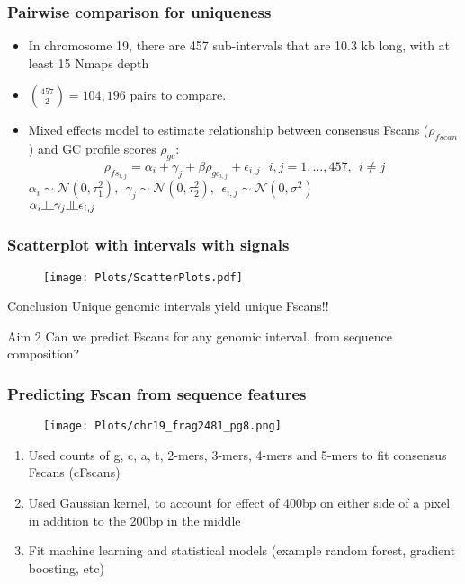 \documentclass[10pt,dvipsnames,table]{beamer}
\begin{document}
\begin{frame}
\frametitle{Pairwise comparison for uniqueness}
\begin{itemize}
\item In chromosome 19, there are 457 sub-intervals that are 10.3 kb long, with at least 15 Nmaps depth
\item $ \binom {457} {2} = 104,196 $ pairs to compare. 
\item Mixed effects model to estimate relationship between consensus Fscans ($\rho_{fscan}$) and GC profile scores $\rho_{gc}$:
\[ 
\rho_{fs_{i,j}} = \alpha_i + \gamma_j + \beta \rho_{gc_{i,j}} + \epsilon_{i,j}\ \ \ i, j = 1, \dots, 457,\ \ i \ne j
\]
$\alpha_i \sim \mathcal{N}(0, \tau_1^2), \ \ \gamma_j \sim \mathcal{N}(0, \tau_2^2), \ \ \epsilon_{i,j} \sim \mathcal{N}(0, \sigma^2)$ \\
$ \alpha_i \indep \gamma_j \indep \epsilon_{i,j}$
\end{itemize}

\end{frame}

\begin{frame}
\frametitle{Scatterplot with intervals with signals}
\begin{figure}
\centering
\texttt{[image: Plots/ScatterPlots.pdf]}
\end{figure}

\begin{block}{Conclusion}
Unique genomic intervals yield unique Fscans!!
\end{block}

\end{frame}

\begin{frame}
\Large
\begin{block}{Aim 2}
Can we predict Fscans for any genomic interval, from sequence composition?
\end{block}
\end{frame}

\begin{frame}
\frametitle{Predicting Fscan from sequence features}
\begin{figure}
\centering
\texttt{[image: Plots/chr19\_frag2481\_pg8.png]}
\end{figure}
\begin{enumerate}
\item Used counts of g, c, a, t, 2-mers, 3-mers, 4-mers and 5-mers to fit consensus Fscans (cFscans)
\item Used Gaussian kernel, to account for effect of 400bp on either side of a pixel in addition to the 200bp in the middle
\item Fit machine learning and statistical models (example random forest, gradient boosting, etc)
\end{enumerate}

\end{frame}
\end{document}
